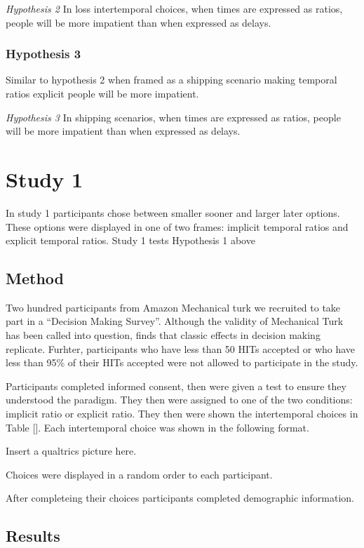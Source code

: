 \documentclass[]{article}
\begin{document}
\textit{Hypothesis 2} In loss intertemporal choices, when times are expressed as ratios, people will be more impatient than when expressed as delays. 


\subsubsection{Hypothesis 3}
Similar to hypothesis 2 when framed as a shipping scenario making temporal ratios explicit people will be more impatient. 

\textit{Hypothesis 3} In shipping scenarios, when times are expressed as ratios, people will be more impatient than when expressed as delays. 

\section{Study 1}
In study 1 participants chose between smaller sooner and larger later options. 
These options were displayed in one of two frames: implicit temporal ratios and explicit temporal ratios. 
Study 1 tests Hypothesis 1 above

\subsection{Method}
Two hundred participants from Amazon Mechanical turk we recruited to take part in a ``Decision Making Survey''. 
Although the validity of Mechanical Turk has been called into question,  finds that classic effects in decision making replicate. 
Furhter, participants who have less than 50 HITs accepted or  who have less than 95\% of their HITs accepted were not allowed to participate in the study. 

Participants completed informed consent, then were given a test to ensure they understood the paradigm.
They then were assigned to one of the two conditions: implicit ratio or explicit ratio. 
They then were shown the intertemporal choices in Table []. 
Each intertemporal choice was shown in the following format.

Insert a qualtrics picture here. 

Choices were displayed in a random order to each participant. 

After completeing their choices participants completed demographic information.

\subsection{Results}
\end{document}
